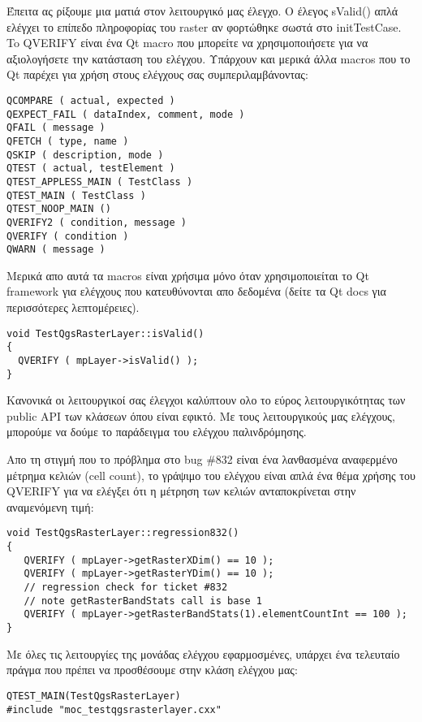 Έπειτα ας ρίξουμε μια ματιά στον λειτουργικό μας έλεγχο. Ο έλεγος sValid() απλά ελέγχει το επίπεδο πληροφορίας του raster αν φορτώθηκε σωστά στο initTestCase. To QVERIFY είναι ένα Qt macro που μπορείτε να χρησιμοποιήσετε για να αξιολογήσετε την κατάσταση του ελέγχου. Υπάρχουν και μερικά άλλα macros που το Qt παρέχει για χρήση στους ελέγχους σας συμπεριλαμβάνοντας:

\begin{verbatim}
QCOMPARE ( actual, expected )
QEXPECT_FAIL ( dataIndex, comment, mode )
QFAIL ( message )
QFETCH ( type, name )
QSKIP ( description, mode )
QTEST ( actual, testElement )
QTEST_APPLESS_MAIN ( TestClass )
QTEST_MAIN ( TestClass )
QTEST_NOOP_MAIN ()
QVERIFY2 ( condition, message )
QVERIFY ( condition )
QWARN ( message ) 
\end{verbatim}

Μερικά απο αυτά τα macros είναι χρήσιμα μόνο όταν χρησιμοποιείται το Qt framework για ελέγχους που κατευθύνονται απο δεδομένα (δείτε τα Qt docs για περισσότερες λεπτομέρειες).

\begin{verbatim}
void TestQgsRasterLayer::isValid()
{
  QVERIFY ( mpLayer->isValid() );
}
\end{verbatim}

Κανονικά οι λειτουργικοί σας έλεγχοι καλύπτουν ολο το εύρος λειτουργικότητας των public API των κλάσεων όπου είναι εφικτό. Με τους λειτουργικούς μας ελέγχους, μπορούμε να δούμε το παράδειγμα του ελέγχου παλινδρόμησης.

Απο τη στιγμή που το πρόβλημα στο  bug \#832 είναι ένα λανθασμένα αναφερμένο μέτρημα κελιών (cell count), το γράψιμο του ελέγχου είναι απλά ένα θέμα χρήσης του QVERIFY για να ελέγξει ότι η μέτρηση των κελιών ανταποκρίνεται στην αναμενόμενη τιμή:

\begin{verbatim}
void TestQgsRasterLayer::regression832()
{
   QVERIFY ( mpLayer->getRasterXDim() == 10 );
   QVERIFY ( mpLayer->getRasterYDim() == 10 );
   // regression check for ticket #832
   // note getRasterBandStats call is base 1
   QVERIFY ( mpLayer->getRasterBandStats(1).elementCountInt == 100 );
}
\end{verbatim}

Με όλες τις λειτουργίες της μονάδας ελέγχου εφαρμοσμένες, υπάρχει ένα τελευταίο πράγμα που πρέπει να προσθέσουμε στην κλάση ελέγχου μας:

\begin{verbatim}
QTEST_MAIN(TestQgsRasterLayer)
#include "moc_testqgsrasterlayer.cxx"
\end{verbatim}

